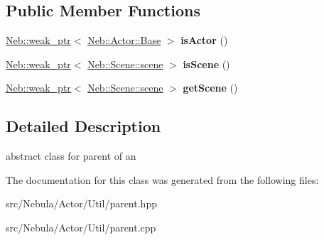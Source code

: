 \subsection*{\-Public \-Member \-Functions}
\begin{DoxyCompactItemize}
\item 
\hypertarget{classNeb_1_1Actor_1_1parent_a008be988dfa197a878a6622314f91a93}{\hyperlink{classNeb_1_1weak__ptr}{\-Neb\-::weak\-\_\-ptr}$<$ \hyperlink{classNeb_1_1Actor_1_1Base}{\-Neb\-::\-Actor\-::\-Base} $>$ {\bfseries is\-Actor} ()}\label{classNeb_1_1Actor_1_1parent_a008be988dfa197a878a6622314f91a93}

\item 
\hypertarget{classNeb_1_1Actor_1_1parent_a9c132ce167bbc2b99d1df0d8e1932918}{\hyperlink{classNeb_1_1weak__ptr}{\-Neb\-::weak\-\_\-ptr}$<$ \hyperlink{classNeb_1_1Scene_1_1scene}{\-Neb\-::\-Scene\-::scene} $>$ {\bfseries is\-Scene} ()}\label{classNeb_1_1Actor_1_1parent_a9c132ce167bbc2b99d1df0d8e1932918}

\item 
\hypertarget{classNeb_1_1Actor_1_1parent_a39169d56c3becf729bd970e2bdd63262}{\hyperlink{classNeb_1_1weak__ptr}{\-Neb\-::weak\-\_\-ptr}$<$ \hyperlink{classNeb_1_1Scene_1_1scene}{\-Neb\-::\-Scene\-::scene} $>$ {\bfseries get\-Scene} ()}\label{classNeb_1_1Actor_1_1parent_a39169d56c3becf729bd970e2bdd63262}

\end{DoxyCompactItemize}


\subsection{\-Detailed \-Description}
abstract class for parent of an  

\-The documentation for this class was generated from the following files\-:\begin{DoxyCompactItemize}
\item 
src/\-Nebula/\-Actor/\-Util/parent.\-hpp\item 
src/\-Nebula/\-Actor/\-Util/parent.\-cpp\end{DoxyCompactItemize}
